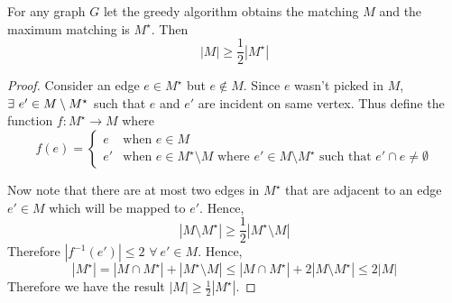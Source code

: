\begin{Theorem}{}{}
	For any graph $G$ let the greedy algorithm obtains the matching $M$ and the maximum matching is $M^{\star}$. Then $$|M|\geq \frac12|M^\star|$$
\end{Theorem}
\begin{proof}
	Consider an edge $e\in M^{\star}$ but $e\notin M$. Since $e$ wasn't  picked in $M$, $\exists\ e'\in M\setminus M^{\star}$ such that $e$ and $e'$ are incident on same vertex. Thus define the function $f:M^{\star}\to M$ where $$f(e)=\begin{cases}
		e&\text{when $e\in M$}\\
		e' & \text{when $e\in M^{\star}\setminus M$ where $e'\in M\setminus M^{\star}$ such that $e'\cap e\neq \emptyset$}
	\end{cases}$$

Now note that there are at most  two edges in $M^{\star}$ that are adjacent to an edge $e'\in M$ which will be mapped to $e'$. Hence, $$|M\setminus M^{\star}|\geq \frac12 |M^{\star}\setminus M|$$Therefore $|f^{-1}(e')|\leq 2$ $\forall\ e'\in M$. Hence, $$|M^\star|=|M\cap M^{\star}|+|M^{\star}\setminus M|\leq |M\cap M^{\star}|+2|M\setminus M^{\star}|\leq 2|M|$$Therefore we have the result $|M|\geq \frac12|M^{\star}|$. 
\end{proof}
